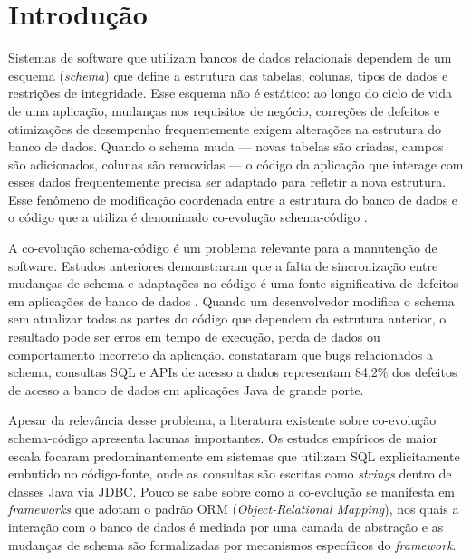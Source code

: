 \documentclass[
  12pt,
  openright,
  oneside,
  a4paper,
  brazil
]{abntex2}
\begin{document}
\chapter{Introdução}

Sistemas de software que utilizam bancos de dados relacionais dependem de um esquema (\textit{schema}) que define a estrutura das tabelas, colunas, tipos de dados e restrições de integridade. Esse esquema não é estático: ao longo do ciclo de vida de uma aplicação, mudanças nos requisitos de negócio, correções de defeitos e otimizações de desempenho frequentemente exigem alterações na estrutura do banco de dados. Quando o schema muda --- novas tabelas são criadas, campos são adicionados, colunas são removidas --- o código da aplicação que interage com esses dados frequentemente precisa ser adaptado para refletir a nova estrutura. Esse fenômeno de modificação coordenada entre a estrutura do banco de dados e o código que a utiliza é denominado co-evolução schema-código \cite{qiu2013}.

A co-evolução schema-código é um problema relevante para a manutenção de software. Estudos anteriores demonstraram que a falta de sincronização entre mudanças de schema e adaptações no código é uma fonte significativa de defeitos em aplicações de banco de dados \cite{meurice2016}. Quando um desenvolvedor modifica o schema sem atualizar todas as partes do código que dependem da estrutura anterior, o resultado pode ser erros em tempo de execução, perda de dados ou comportamento incorreto da aplicação.  constataram que bugs relacionados a schema, consultas SQL e APIs de acesso a dados representam 84,2\% dos defeitos de acesso a banco de dados em aplicações Java de grande porte.

Apesar da relevância desse problema, a literatura existente sobre co-evolução schema-código apresenta lacunas importantes. Os estudos empíricos de maior escala \cite{qiu2013,vassiliadis2023} focaram predominantemente em sistemas que utilizam SQL explicitamente embutido no código-fonte, onde as consultas são escritas como \textit{strings} dentro de classes Java via JDBC. Pouco se sabe sobre como a co-evolução se manifesta em \textit{frameworks} que adotam o padrão ORM (\textit{Object-Relational Mapping}), nos quais a interação com o banco de dados é mediada por uma camada de abstração e as mudanças de schema são formalizadas por mecanismos específicos do \textit{framework}.
\end{document}

